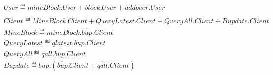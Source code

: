 \begin{align*}
    &User \eqdef \overline{mineBlock}.User + block.User + \overline{addpeer}.User \\\\
    &Client \eqdef MineBlock.Client + QueryLatest.Client + QueryAll.Client + Bupdate.Client \\%
    &MineBlock \eqdef mineBlock.\overline{bup}.Client\\
    &QueryLatest \eqdef qlatest.\overline{bup}.Client\\
    &QueryAll \eqdef qall.\overline{bup}.Client\\
    &Bupdate \eqdef bup.(\overline{bup}.Client + \overline{qall}.Client)\\
\end{align*}
